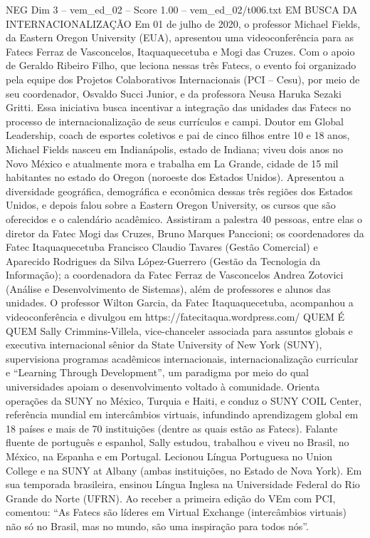 \begin{textsample}{NEG Dim 3 – vem\_ed\_02 – Score 1.00 – vem\_ed\_02/t006.txt}  \label{ex:f3_neg_050}
EM BUSCA DA INTERNACIONALIZAÇÃO Em 01 de julho de 2020, o professor Michael Fields, da Eastern Oregon University (EUA), apresentou uma videoconferência para as Fatecs Ferraz de Vasconcelos, Itaquaquecetuba e Mogi das Cruzes.
Com o apoio de Geraldo Ribeiro Filho, que leciona nessas três Fatecs, o evento foi organizado pela equipe dos Projetos Colaborativos Internacionais (PCI – Cesu), por meio de seu coordenador, Osvaldo Succi Junior, e da professora Neusa Haruka Sezaki Gritti.
Essa iniciativa busca incentivar a integração das unidades das Fatecs no processo de internacionalização de seus currículos e campi.
Doutor em Global Leadership, coach de esportes coletivos e pai de cinco filhos entre 10 e 18 anos, Michael Fields nasceu em Indianápolis, estado de Indiana; viveu dois anos no Novo México e atualmente mora e trabalha em La Grande, cidade de 15 mil habitantes no estado do Oregon (noroeste dos Estados Unidos).
Apresentou a diversidade geográfica, demográfica e econômica dessas três regiões dos Estados Unidos, e depois falou sobre a Eastern Oregon University, os cursos que são oferecidos e o calendário acadêmico.
Assistiram a palestra 40 pessoas, entre elas o diretor da Fatec Mogi das Cruzes, Bruno Marques Panccioni; os coordenadores da Fatec Itaquaquecetuba Francisco Claudio Tavares (Gestão Comercial) e Aparecido Rodrigues da Silva López-Guerrero (Gestão da Tecnologia da Informação); a coordenadora da Fatec Ferraz de Vasconcelos Andrea Zotovici (Análise e Desenvolvimento de Sistemas), além de professores e alunos das unidades.
O professor Wilton Garcia, da Fatec Itaquaquecetuba, acompanhou a videoconferência e divulgou em https://fatecitaqua.wordpress.com/ QUEM É QUEM Sally Crimmins-Villela, vice-chanceler associada para assuntos globais e executiva internacional sênior da State University of New York (SUNY), supervisiona programas acadêmicos internacionais, internacionalização curricular e “Learning Through Development”, um paradigma por meio do qual universidades apoiam o desenvolvimento voltado à comunidade.
Orienta operações da SUNY no México, Turquia e Haiti, e conduz o SUNY COIL Center, referência mundial em intercâmbios virtuais, infundindo aprendizagem global em 18 países e mais de 70 instituições (dentre as quais estão as Fatecs).
Falante fluente de português e espanhol, Sally estudou, trabalhou e viveu no Brasil, no México, na Espanha e em Portugal.
Lecionou Língua Portuguesa no Union College e na SUNY at Albany (ambas instituições, no Estado de Nova York).
Em sua temporada brasileira, ensinou Língua Inglesa na Universidade Federal do Rio Grande do Norte (UFRN).
Ao receber a primeira edição do VEm com PCI, comentou: “As Fatecs são líderes em Virtual Exchange (intercâmbios virtuais) não só no Brasil, mas no mundo, são uma inspiração para todos nós”.

\end{textsample}
